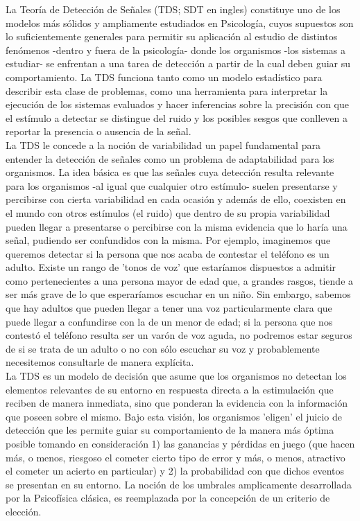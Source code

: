 La Teoría de Detección de Señales (TDS; SDT en ingles) constituye uno de los modelos más sólidos y ampliamente estudiados en Psicología, cuyos supuestos son lo suficientemente generales para permitir su aplicación al estudio de distintos fenómenos -dentro y fuera de la psicología- donde los organismos -los sistemas a estudiar- se enfrentan a una tarea de detección a partir de la cual deben guiar su comportamiento. La TDS funciona tanto como un modelo estadístico para describir esta clase de problemas, como una herramienta para interpretar la ejecución de los sistemas evaluados y hacer inferencias sobre la precisión con que el estímulo a detectar se distingue del ruido y los posibles sesgos que conlleven a reportar la presencia o ausencia de la señal.\\

La TDS le concede a la noción de variabilidad un papel fundamental para entender la detección de señales como un problema de adaptabilidad para los organismos. La idea básica es que las señales cuya detección resulta relevante para los organismos -al igual que cualquier otro estímulo- suelen presentarse y percibirse con cierta variabilidad en cada ocasión y además de ello, coexisten en el mundo con otros estímulos (el ruido) que dentro de su propia variabilidad pueden llegar a presentarse o percibirse con la misma evidencia que lo haría una señal, pudiendo ser confundidos con la misma. Por ejemplo, imaginemos que queremos detectar si la persona que nos acaba de contestar el teléfono es un adulto. Existe un rango de 'tonos de voz' que estaríamos dispuestos a admitir como pertenecientes a una persona mayor de edad que, a grandes rasgos, tiende a ser más grave de lo que esperaríamos escuchar en un niño. Sin embargo, sabemos que hay adultos que pueden llegar a tener una voz particularmente clara que puede llegar a confundirse con la de un menor de edad; si la persona que nos contestó el teléfono resulta ser un varón de voz aguda, no podremos estar seguros de si se trata de un adulto o no con sólo escuchar su voz y probablemente necesitemos consultarle de manera explícita.\\

La TDS es un modelo de decisión que asume que los organismos no detectan los elementos relevantes de su entorno en respuesta directa a la estimulación que reciben de manera inmediata, sino que ponderan la evidencia con la información que poseen sobre el mismo. Bajo esta visión, los organismos 'eligen' el juicio de detección que les permite guiar su comportamiento de la manera más óptima posible tomando en consideración 1) las ganancias y pérdidas en juego (que hacen más, o menos, riesgoso el cometer cierto tipo de error y más, o menos, atractivo el cometer un acierto en particular) y 2) la probabilidad con que dichos eventos se presentan en su entorno.  La noción de los umbrales amplicamente desarrollada por la Psicofísica clásica, es reemplazada por la concepción de un criterio de elección.\\ 

